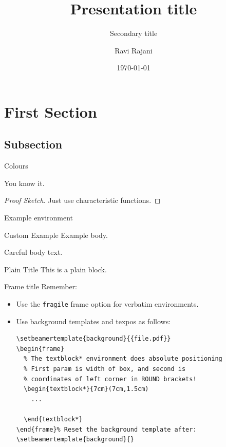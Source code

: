 \documentclass[notes=onslide]{slides} %
\title
{Presentation title}
\subtitle
{Secondary title}
\author
{Ravi Rajani}
\institute
{Department of Mathematics}
\date{\today}
\begin{document}
\begin{frame}
  \titlepage
\end{frame}


\section{First Section}

\subsection{Subsection}

\begin{frame}{Colours}
\begin{theorem}
You know it. 
\end{theorem}
\begin{proof}[Proof Sketch]
Just use characteristic functions.
\end{proof}
\begin{example}
Example environment
\end{example}
\begin{minipage}{.5\textwidth}
  \begin{exampleblock}{Custom Example}
    Example body.
    \end{exampleblock}
\end{minipage}
\begin{alertblock}{Careful}
  body text.
\end{alertblock}
\begin{plainblock}{Plain Title}
This is a plain block.
\end{plainblock}
\end{frame}

\begin{frame}[fragile]{Frame title}
    Remember:
    \begin{itemize}[<+->]
      \item Use the \texttt{fragile} frame option for \textcolor<2->{OUMidBlue}{verbatim} environments.
      \item Use \colorbox{OUYellow}{background templates} and \alert{texpos} as follows:
            \begin{verbatim}
\setbeamertemplate{background}{{file.pdf}}
\begin{frame}
  % The textblock* environment does absolute positioning
  % First param is width of box, and second is
  % coordinates of left corner in ROUND brackets!
  \begin{textblock*}{7cm}(7cm,1.5cm)
    ...
    
  \end{textblock*}
\end{frame}% Reset the background template after:
\setbeamertemplate{background}{}
\end{verbatim}
    \end{itemize}
\end{frame}
\end{document}
